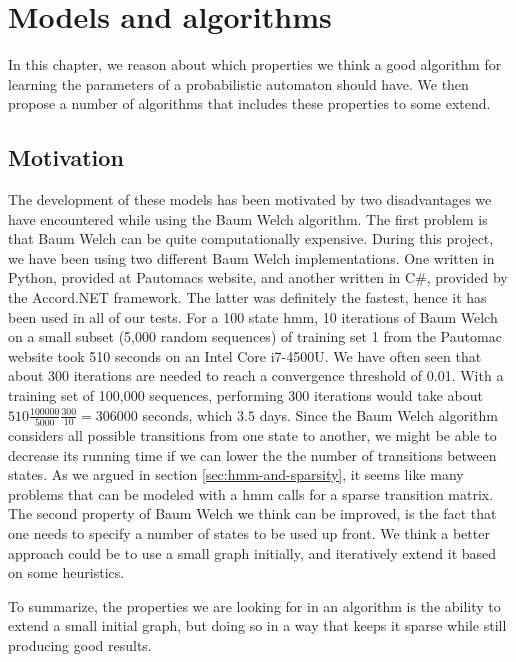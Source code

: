 \chapter{Models and algorithms}
In this chapter, we reason about which properties we think a good algorithm for learning the parameters of a probabilistic automaton should have.
We then propose a number of algorithms that includes these properties to some extend.

\section{Motivation}
The development of these models has been motivated by two disadvantages we have encountered while using the Baum Welch algorithm.
The first problem is that Baum Welch can be quite computationally expensive.
During this project, we have been using two different Baum Welch implementations. One written in Python, provided at Pautomacs website, and another written in C\#, provided by the Accord.NET framework. The latter was definitely the fastest, hence it has been used in all of our tests.
For a 100 state \gls{hmm}, 10 iterations of Baum Welch on a small subset (5,000 random sequences) of training set 1 from the Pautomac website took 510 seconds on an Intel Core i7-4500U. We have often seen that about 300 iterations are needed to reach a convergence threshold of 0.01. With a training set of 100,000 sequences, performing 300 iterations would take about $510\frac{100000}{5000}\frac{300}{10} = 306000$ seconds, which $3.5$ days.
Since the Baum Welch algorithm considers all possible transitions from one state to another, we might be able to decrease its running time if we can lower the the number of transitions between states. As we argued in section \ref{sec:hmm-and-sparsity}, it seems like many problems that can be modeled with a \gls{hmm} calls for a sparse transition matrix.
The second property of Baum Welch we think can be improved, is the fact that one needs to specify a number of states to be used up front.
We think a better approach could be to use a small graph initially, and iteratively extend it based on some heuristics.

To summarize, the properties we are looking for in an algorithm is the ability to extend a small initial graph, but doing so in a way that keeps it sparse while still producing good results.




